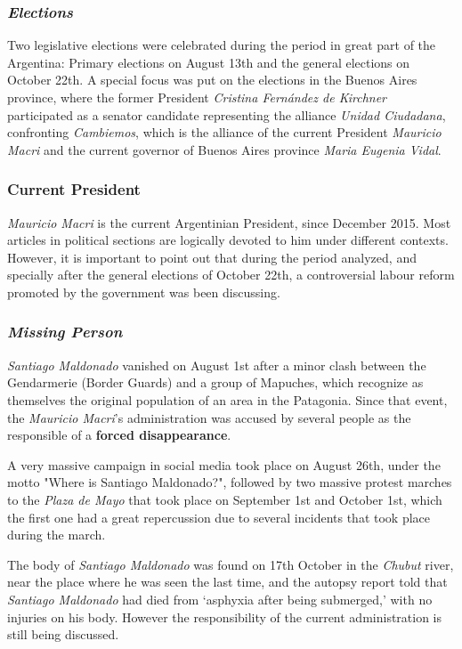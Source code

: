 \documentclass[a4paper, 12pt]{article}
\begin{document}
\subsubsection{\emph{Elections}}
\par Two legislative elections were celebrated during the period in great part of the Argentina: Primary elections on August 13th and the general elections on October 22th. 
A special focus was put on the elections in the Buenos Aires province, where the former President \emph{Cristina Fern\'andez de Kirchner} participated as a senator candidate representing the alliance \emph{Unidad Ciudadana}, confronting \emph{Cambiemos}, which is the alliance of the current President \emph{Mauricio Macri} and the current governor of Buenos Aires province \emph{Maria Eugenia Vidal}.
 
\subsubsection{Current President}
\par \emph{Mauricio Macri} is the current Argentinian President, since December 2015. 
Most articles in political sections are logically devoted to him under different contexts.
However, it is important to point out that during the period analyzed, and specially after the general elections of October 22th, a controversial labour reform promoted by the government was been discussing.

\subsubsection{\emph{Missing Person}}
\par \emph{Santiago Maldonado} vanished on August 1st after a minor clash between the Gendarmerie (Border Guards) and a group of Mapuches, which recognize as themselves the original population of an area in the Patagonia.
Since that event, the \emph{Mauricio Macri}'s administration was accused by several people as the responsible of a \textbf{forced disappearance}. 
\par A very massive campaign in social media took place on August 26th, under the motto "Where is Santiago Maldonado?", followed by two massive protest marches to the \emph{Plaza de Mayo} that took place on September 1st and October 1st, which the first one had a great repercussion due to several incidents that took place during the march.
\par The body of \emph{Santiago Maldonado} was found on 17th October in the \emph{Chubut} river, near the place where he was seen the last time, and the autopsy report told that \emph{Santiago Maldonado} had died from ‘asphyxia after being submerged,’ with no injuries on his body. 
However the responsibility of the current administration is still being discussed.
\end{document}
